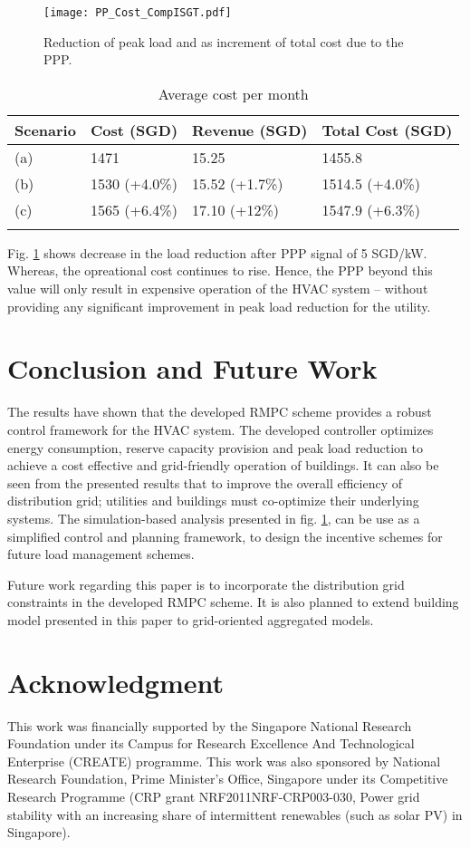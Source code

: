 \documentclass[conference,10pt]{IEEEtran}
\begin{document}
\begin{figure}[!ht]
	\centering
  \texttt{[image: PP\_Cost\_CompISGT.pdf]}
  \caption{Reduction of peak load and as increment of total cost due to the PPP.}
\label{fig7}
\end{figure}
\begin{table}[!t]
\renewcommand{\arraystretch}{1.3}
\caption{Average cost per month}
\label{table1}
\centering
\begin{tabular}{llll}
\firsthline
\bfseries Scenario & \bfseries Cost (SGD) & \bfseries Revenue (SGD) & \bfseries Total Cost (SGD) \\
\hline
(a)  & 1471 & 15.25 & 1455.8 \\
\hline
(b)  & 1530 (+4.0\%) & 15.52 (+1.7\%) & 1514.5 (+4.0\%) \\
\hline
(c)  & 1565 (+6.4\%) & 17.10 (+12\%) & 1547.9 (+6.3\%) \\
\lasthline
\end{tabular}
\end{table}


Fig. \ref{fig7} shows decrease in the load reduction after PPP signal of 5 SGD/kW. Whereas, the opreational cost continues to rise. Hence, the PPP beyond this value will only result in expensive operation of the HVAC system -- without providing any significant improvement in peak load reduction for the utility. 

\section{Conclusion and Future Work}\label{sec:4}
The results have shown that the developed RMPC scheme provides a robust control framework for the HVAC system. The developed controller optimizes energy consumption, reserve capacity provision and peak load reduction to achieve a cost effective and grid-friendly operation of buildings. It can also be seen from the presented results that to improve the overall efficiency of distribution grid; utilities and buildings must co-optimize their underlying systems. The simulation-based analysis presented in fig. \ref{fig7}, can be use as a simplified control and planning framework, to design the incentive schemes for future load management schemes. 

Future work regarding this paper is to incorporate the distribution grid constraints in the developed RMPC scheme. It is also planned to extend building model presented in this paper to grid-oriented aggregated models.  
\section{Acknowledgment}\label{sec:5}
This work was financially supported by the Singapore National Research Foundation under its Campus for Research Excellence And Technological Enterprise (CREATE) programme. This work was also sponsored by National Research Foundation, Prime Minister’s Office, Singapore under its Competitive Research Programme (CRP grant NRF2011NRF-CRP003-030, Power grid stability with an increasing share of intermittent renewables (such as solar PV) in Singapore).
\FloatBarrier



\end{document}
